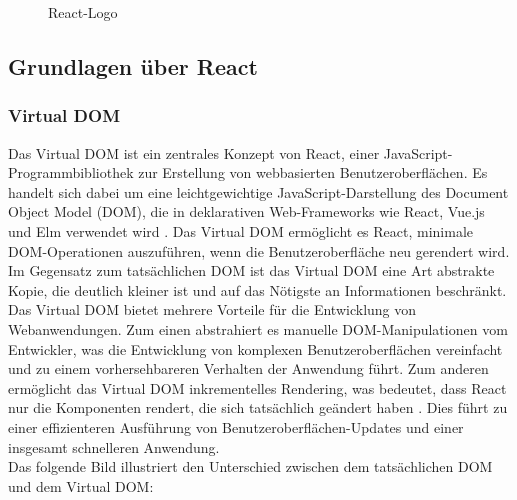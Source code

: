 \begin{figure}[htbp]
	\centering
	\caption{React-Logo}
\end{figure}

\subsection{Grundlagen über React}
\subsubsection{Virtual DOM}
Das Virtual DOM ist ein zentrales Konzept von React, einer JavaScript-Programmbibliothek zur Erstellung von webbasierten Benutzeroberflächen\cite{ReactWikipedia}. Es handelt sich dabei um eine leichtgewichtige JavaScript-Darstellung des Document Object Model (DOM), die in deklarativen Web-Frameworks wie React, Vue.js und Elm verwendet wird \cite{VueJsAdesso}. Das Virtual DOM ermöglicht es React, minimale DOM-Operationen auszuführen, wenn die Benutzeroberfläche neu gerendert wird. Im Gegensatz zum tatsächlichen DOM ist das Virtual DOM eine Art abstrakte Kopie, die deutlich kleiner ist und auf das Nötigste an Informationen beschränkt.\cite{ReactWikipedia}\\
Das Virtual DOM bietet mehrere Vorteile für die Entwicklung von Webanwendungen. Zum einen abstrahiert es manuelle DOM-Manipulationen vom Entwickler, was die Entwicklung von komplexen Benutzeroberflächen vereinfacht und zu einem vorhersehbareren Verhalten der Anwendung führt. Zum anderen ermöglicht das Virtual DOM inkrementelles Rendering, was bedeutet, dass React nur die Komponenten rendert, die sich tatsächlich geändert haben \cite{ReactWikipedia}. Dies führt zu einer effizienteren Ausführung von Benutzeroberflächen-Updates und einer insgesamt schnelleren Anwendung.\\
Das folgende Bild illustriert den Unterschied zwischen dem tatsächlichen DOM und dem Virtual DOM:


